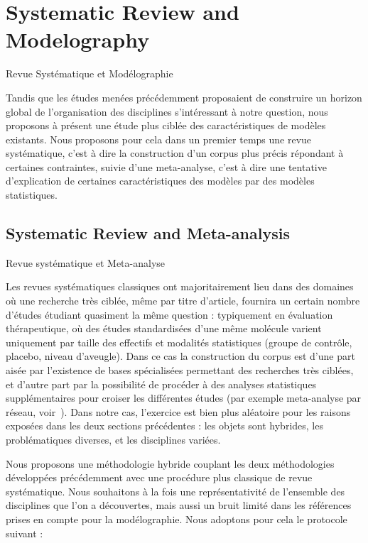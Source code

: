 



\newpage

\section{Systematic Review and Modelography}{Revue Systématique et Modélographie}

\label{sec:modelography}



Tandis que les études menées précédemment proposaient de construire un horizon global de l'organisation des disciplines s'intéressant à notre question, nous proposons à présent une étude plus ciblée des caractéristiques de modèles existants. Nous proposons pour cela dans un premier temps une revue systématique, c'est à dire la construction d'un corpus plus précis répondant à certaines contraintes, suivie d'une meta-analyse, c'est à dire une tentative d'explication de certaines caractéristiques des modèles par des modèles statistiques.


\subsection[Systematic Review][Revue Systématique]{Systematic Review and Meta-analysis}{Revue systématique et Meta-analyse}



Les revues systématiques classiques ont majoritairement lieu dans des domaines où une recherche très ciblée, même par titre d'article, fournira un certain nombre d'études étudiant quasiment la même question : typiquement en évaluation thérapeutique, où des études standardisées d'une même molécule varient uniquement par taille des effectifs et modalités statistiques (groupe de contrôle, placebo, niveau d'aveugle). Dans ce cas la construction du corpus est d'une part aisée par l'existence de bases spécialisées permettant des recherches très ciblées, et d'autre part par la possibilité de procéder à des analyses statistiques supplémentaires pour croiser les différentes études (par exemple meta-analyse par réseau, voir~\cite{rucker2012network}). Dans notre cas, l'exercice est bien plus aléatoire pour les raisons exposées dans les deux sections précédentes : les objets sont hybrides, les problématiques diverses, et les disciplines variées.


Nous proposons une méthodologie hybride couplant les deux méthodologies développées précédemment avec une procédure plus classique de revue systématique. Nous souhaitons à la fois une représentativité de l'ensemble des disciplines que l'on a découvertes, mais aussi un bruit limité dans les références prises en compte pour la modélographie. Nous adoptons pour cela le protocole suivant :

